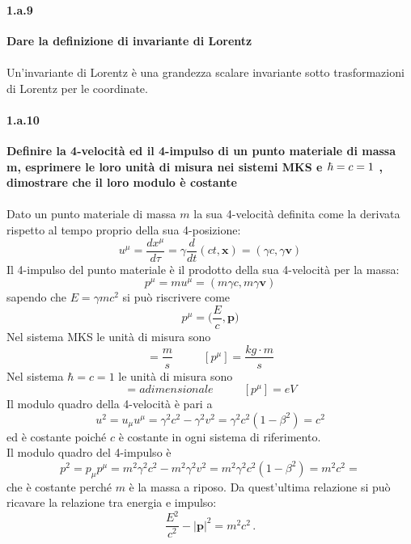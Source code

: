 \documentclass[twoside]{article}
\begin{document}
\paragraph{1.a.9} \textbf{Dare la definizione di invariante di Lorentz}\\
\\
Un'invariante di Lorentz è una grandezza scalare invariante sotto trasformazioni di Lorentz per le coordinate.
\paragraph{1.a.10} \textbf{Definire la 4-velocità ed il 4-impulso di un punto materiale di massa m, esprimere le loro unità di misura nei sistemi MKS e $\hbar=\mathnormal{c}=1$ , dimostrare che il loro modulo è costante}\\
\\
Dato un punto materiale di massa $m$ la sua 4-velocità definita come la derivata rispetto al tempo proprio della sua 4-posizione:
\begin{equation*}
    u^{\mu}=\frac{dx^{\mu}}{d\tau}=\gamma\frac{d}{dt}(ct, \mathbf{x})=(\gamma c,\gamma\mathbf{v})
\end{equation*}
Il 4-impulso del punto materiale è il prodotto della sua 4-velocità per la massa:
\begin{equation*}
    p^{\mu}=mu^{\mu}=(m\gamma c,m\gamma\mathbf{v})
\end{equation*}
sapendo che $E=\gamma m c^2$ si può riscrivere come
\begin{equation*}
    p^{\mu}=\biggl(\frac{E}{c},\mathbf{p}\biggr)
\end{equation*}
Nel sistema MKS le unità di misura sono
\begin{equation*}
    [u^{\mu}]=\frac{m}{s}\ \ \ \ \ \ \ \ \ \ \ \ [p^{\mu}]=\frac{kg\cdot m}{s}
\end{equation*}
Nel sistema $\hbar=c=1$ le unità di misura sono
\begin{equation*}
    [u^{\mu}]=adimensionale\ \ \ \ \ \ \ \ \ \ \ \ [p^{\mu}]=eV
\end{equation*}
Il modulo quadro della 4-velocità è pari a 
\begin{equation*}
    u^2=u_{\mu}u^{\mu}=\gamma^2 c^2-\gamma^2 v^2=\gamma^2 c^2(1-\beta^2)=c^2
\end{equation*}
ed è costante poiché $c$ è costante in ogni sistema di riferimento.\\
Il modulo quadro del 4-impulso è 
\begin{equation*}
    p^2=p_{\mu}p^{\mu}=m^2\gamma^2c^2-m^2\gamma^2v^2=m^2\gamma^2c^2(1-\beta^2)=m^2c^2=
\end{equation*}
che è costante perché $m$ è la massa a riposo. Da quest'ultima relazione si può ricavare la relazione tra energia e impulso:
\begin{equation*}
    \frac{E^2}{c^2}-|\mathbf{p}|^2=m^2c^2\,.
\end{equation*}
\end{document}
